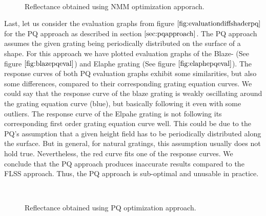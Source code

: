 \begin{figure}[H]
  \centering
~
\caption[Validation of NMM Approach applied on our Gratings]{Reflectance obtained using NMM optimization apporach.}
\label{fig:evaluationdiffshadernminmax}
\end{figure}

Last, let us consider the evaluation graphs from figure $\ref{fig:evaluationdiffshaderpq}$ for the PQ approach as described in section $\ref{sec:pqapproach}$. The PQ approach assumes the given grating being periodically distributed on the surface of a shape. For this approach we have plotted evaluation graphs of the Blaze- (See figure $\ref{fig:blazepqeval}$) and Elaphe grating (See figure $\ref{fig:elaphepqeval}$). The response curves of both PQ evaluation graphs exhibit some similarities, but also some differences, compared to their corresponding grating equation curves. We could say that the response curve of the blaze grating is weakly oscillating around the grating equation curve (blue), but basically following it even with some outliers. The response curve of the Elpahe grating is not following its corresponding first order grating equation curve well. This could be due to the PQ's assumption that a given height field has to be periodically distributed along the surface. But in general, for natural gratings, this assumption usually does not hold true. Nevertheless, the red curve fits one of the response curves. We conclude that the PQ approach produces inaccurate results compared to the FLSS approach. Thus, the PQ approach is sub-optimal and unusable in practice.

\begin{figure}[H]
  \centering
~
\caption[Validation of PQ Approach applied on our Gratings]{Reflectance obtained using PQ optimization approach.}
\label{fig:evaluationdiffshaderpq}
\end{figure}
